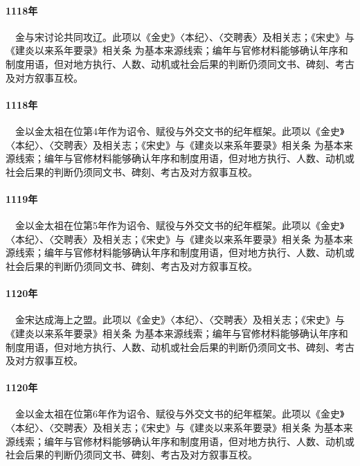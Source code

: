 \paragraph{1118年}　金与宋讨论共同攻辽。此项以《金史》〈本纪〉、〈交聘表〉及相关志；《宋史》与《建炎以来系年要录》相关条 为基本来源线索；编年与官修材料能够确认年序和制度用语，但对地方执行、人数、动机或社会后果的判断仍须同文书、碑刻、考古及对方叙事互校。

\paragraph{1118年}　金以金太祖在位第4年作为诏令、赋役与外交文书的纪年框架。此项以《金史》〈本纪〉、〈交聘表〉及相关志；《宋史》与《建炎以来系年要录》相关条 为基本来源线索；编年与官修材料能够确认年序和制度用语，但对地方执行、人数、动机或社会后果的判断仍须同文书、碑刻、考古及对方叙事互校。

\paragraph{1119年}　金以金太祖在位第5年作为诏令、赋役与外交文书的纪年框架。此项以《金史》〈本纪〉、〈交聘表〉及相关志；《宋史》与《建炎以来系年要录》相关条 为基本来源线索；编年与官修材料能够确认年序和制度用语，但对地方执行、人数、动机或社会后果的判断仍须同文书、碑刻、考古及对方叙事互校。

\paragraph{1120年}　金宋达成海上之盟。此项以《金史》〈本纪〉、〈交聘表〉及相关志；《宋史》与《建炎以来系年要录》相关条 为基本来源线索；编年与官修材料能够确认年序和制度用语，但对地方执行、人数、动机或社会后果的判断仍须同文书、碑刻、考古及对方叙事互校。

\paragraph{1120年}　金以金太祖在位第6年作为诏令、赋役与外交文书的纪年框架。此项以《金史》〈本纪〉、〈交聘表〉及相关志；《宋史》与《建炎以来系年要录》相关条 为基本来源线索；编年与官修材料能够确认年序和制度用语，但对地方执行、人数、动机或社会后果的判断仍须同文书、碑刻、考古及对方叙事互校。

